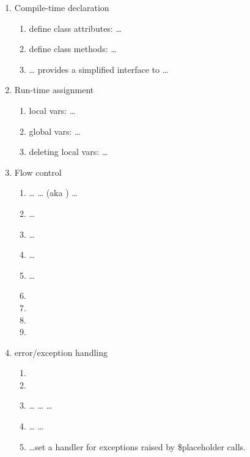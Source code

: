 \begin{enumerate}
\item Compile-time declaration
     \begin{enumerate}
     \item define class attributes:  \ldots
     \item define class methods:  \ldots {}
     \item {} \ldots {} provides a simplified
          interface to  \ldots {}
     \end{enumerate}

\item Run-time assignment
     \begin{enumerate}
     \item local vars:  \ldots
     \item global vars:  \ldots
     \item deleting local vars:  \ldots
     \end{enumerate}

\item Flow control
     \begin{enumerate}
     \item {} \ldots {} \ldots {} (aka
          ) \ldots {}
     \item {} \ldots {}
     \item {} \ldots {}
     \item {} \ldots {}
     \item {} \ldots {}
     \item {}
     \item {}
     \item {}
     \item {}
     \end{enumerate}

\item error/exception handling
     \begin{enumerate}
     \item {}
     \item {}
     \item {} \ldots {} \ldots {} \ldots
     \item {} \ldots {} \ldots {}
     \item {} \ldots set a handler for exceptions raised by
\$placeholder calls.
     \end{enumerate}


\end{enumerate}
